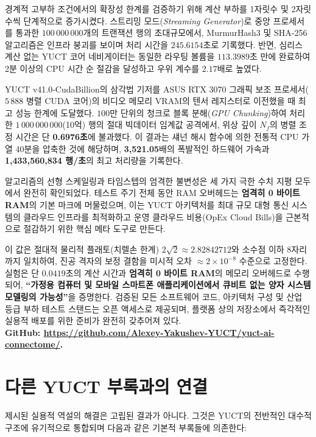 \documentclass[11pt,a4paper]{article}
\begin{document}
	경계적 고부하 조건에서의 확장성 한계를 검증하기 위해 계산 부하를 1자릿수 및 2자릿수씩 단계적으로 증가시켰다. 스트리밍 모드(\textit{Streaming Generator})로 중앙 프로세서를 통과한 \(100\,000\,000\)개의 트랜잭션 행의 초대규모에서, MurmurHash3 및 SHA‑256 알고리즘은 인프라 붕괴를 보이며 처리 시간을 \(245.6154\)초로 기록했다. 반면, 심리스 계산 없는 YUCT 코어 네비게이터는 동일한 라우팅 볼륨을 \(113.3989\)초 만에 완료하여 2분 이상의 CPU 시간 순 절감을 달성하고 우위 계수를 \(2.17\)배로 높였다.
	
	YUCT v41.0‑CudaBillion의 삼각법 기저를 ASUS RTX 3070 그래픽 보조 프로세서(\(5\,888\) 병렬 CUDA 코어)의 비디오 메모리 VRAM의 텐서 레지스터로 이전했을 때 최고 성능 한계에 도달했다. \(100\)만 단위의 청크로 블록 분해(\textit{GPU Chunking})하여 처리한 \(1\,000\,000\,000\)(10억) 행의 절대 빅데이터 임계값 공격에서, 위상 깊이 \(N_f\)의 병렬 조정 시간은 단 \textbf{0.6976초}에 불과했다. 이 결과는 섀넌 해시 함수에 의한 전통적 CPU 가열 40분을 압축한 것에 해당하며, \textbf{3,521.05}배의 폭발적인 하드웨어 가속과 \textbf{1,433,560,834 행/초}의 최고 처리량을 기록한다.
	
	알고리즘의 선형 스케일링과 타임스텝의 엄격한 불변성은 세 가지 극한 수치 지평 모두에서 완전히 확인되었다. 테스트 주기 전체 동안 RAM 오버헤드는 \textbf{엄격히 0 바이트 RAM}의 기본 마크에 머물렀으며, 이는 YUCT 아키텍처를 최대 규모 대형 통신 시스템의 클라우드 인프라를 최적화하고 운영 클라우드 비용(OpEx Cloud Bills)을 근본적으로 절감하기 위한 핵심 메타 도구로 만든다.
	
	이 값은 절대적 물리적 플래토(치렐손 한계) \(2\sqrt{2} \approx 2.82842712\)와 소수점 이하 8자리까지 일치하여, 진공 격자의 보정 결함을 미시적 오차 \(\approx 2 \times 10^{-8}\) 수준으로 고정한다. 실험은 단 \(0.0419\)초의 계산 시간과 \textbf{엄격히 0 바이트 RAM}의 메모리 오버헤드로 수행되어, \textbf{“가정용 컴퓨터 및 모바일 스마트폰 애플리케이션에서 큐비트 없는 양자 시스템 모델링의 가능성”}을 증명한다.
	검증된 모든 소프트웨어 코드, 아키텍처 구성 및 산업 등급 부하 테스트 스탠드는 오픈 액세스로 제공되며, 플랫폼 상의 저장소에서 즉각적인 실용적 배포를 위한 준비가 완전히 갖추어져 있다.\\
	\small \textbf{GitHub: \url{https://github.com/Alexey-Yakushev-YUCT/yuct-ai-connectome/}.}
	
	\section{다른 YUCT 부록과의 연결}
	
	제시된 실용적 역설의 해결은 고립된 결과가 아니다. 그것은 YUCT의 전반적인 대수적 구조에 유기적으로 통합되며 다음과 같은 기본적 부록들에 의존한다:
	
\end{document}
